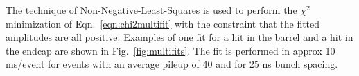 \documentclass[journal]{IEEEtran}
\begin{document}
The technique of Non-Negative-Least-Squares \cite{nnls} is used to perform the $\chi^2$ minimization of Eqn.~\ref{eqn:chi2multifit} with the constraint that the fitted amplitudes are all positive. Examples of one fit for a hit in the barrel and a hit in the endcap are shown in Fig.~\ref{fig:multifits}. The fit is performed in approx 10 ms/event for events with an average pileup of 40 and for 25 ns bunch spacing.
%
\begin{figure}[!t]
  \begin{center}

\end{center}
\end{figure}
\end{document}
